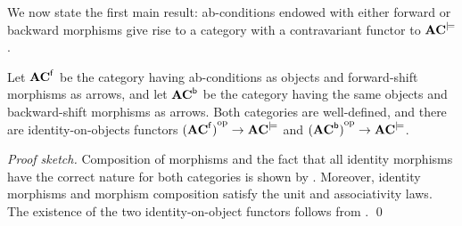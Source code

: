 %
We now state the first main result: ab-conditions endowed with either forward or backward morphisms give rise to a category with a contravariant functor to $\mathbf{AC}^{\models}$.

\begin{theorem}
Let $\mathbf{AC}^{{\mathsf{f}}}$ be the category having ab-conditions as objects and forward-shift morphisms as arrows, and let $\mathbf{AC}^{{\mathsf{b}}}$ be the category having the same objects and backward-shift morphisms as arrows. Both categories are well-defined, and there are identity-on-objects functors ${(\mathbf{AC}^{{\mathsf{f}}})}^{\mathrm{op}} \rightarrow \mathbf{AC}^{\models}$ and ${(\mathbf{AC}^{{\mathsf{b}}})}^{\mathrm{op}} \rightarrow \mathbf{AC}^{\models}$.
\end{theorem}
%
\emph{Proof sketch.} Composition of morphisms and the fact that all identity morphisms have the correct nature for both categories is shown by .
Moreover, identity morphisms and morphism composition satisfy the unit and associativity laws. The existence of the two identity-on-object functors follows from .
\qed 


